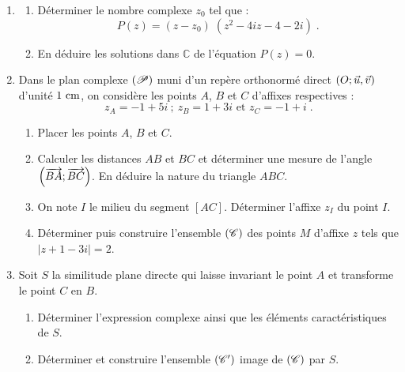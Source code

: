       \begin{enumerate}
            \item \begin{enumerate}
                        \item D\'eterminer le nombre complexe $z_0$ tel que : 
                              \[
                                    P(z) = (z - z_0) \; ( z^2 - 4 i z - 4 - 2i ) \;.
                              \]
                        \item En d\'eduire les solutions dans $\mathbb{C}$ de l'\'equation $P(z) = 0$.
                  \end{enumerate}
            \item Dans le plan complexe $(\mathscr{P})$ muni d'un rep\`ere orthonorm\'e direct $(O ; \vec{u}, \vec{v})$ d'unit\'e $1 ~\mathrm{cm}$,
                  on consid\`ere les points $A$, $B$ et $C$ d'affixes respectives : 
                  \[
                        z_A = -1 + 5i \ ; \ z_B = 1 + 3i \text{ et } z_C = -1 + i \;.
                  \]
                  \begin{enumerate}
                        \item Placer les points $A$, $B$ et $C$.
                        \item Calculer les distances $AB$ et $BC$ et d\'eterminer une mesure de l'angle $\left( \overrightarrow{BA} ; \overrightarrow{BC} \right)$.
                              En d\'eduire la nature du triangle $ABC$.
                        \item On note $I$ le milieu du segment $[AC]$. 
                              D\'eterminer l'affixe $z_I$ du point $I$.
                        \item D\'eterminer puis construire l'ensemble $(\mathscr{C})$ des points $M$ d'affixe $z$ tels que 
                              $|z + 1 - 3i| = 2$.
                  \end{enumerate}
            \item Soit $S$ la similitude plane directe qui laisse invariant le point $A$ et transforme le point $C$ en $B$.
                  \begin{enumerate}
                        \item D\'eterminer l'expression complexe ainsi que les \'el\'ements caract\'eristiques de $S$.
                        \item D\'eterminer et construire l'ensemble $(\mathscr{C}')$ image de $(\mathscr{C})$ par $S$.
                  \end{enumerate}
      \end{enumerate}
